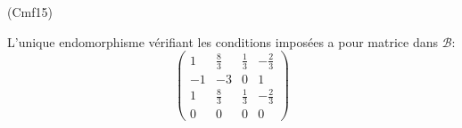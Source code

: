 \begin{tiny}(Cmf15)\end{tiny} L'unique endomorphisme vérifiant les conditions imposées a pour matrice dans $\mathcal{B}$:
\begin{displaymath}
 \begin{pmatrix}
  1 & \frac{8}{3} & \frac{1}{3} & -\frac{2}{3} \\
  -1 & -3 & 0 & 1\\
  1 & \frac{8}{3} & \frac{1}{3} & -\frac{2}{3} \\
 0 & 0 & 0 & 0
 \end{pmatrix}
\end{displaymath}
 